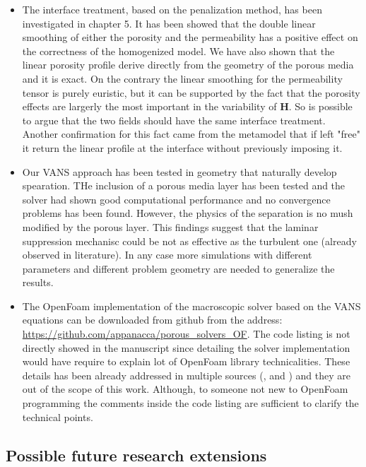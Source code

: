 \begin{itemize}
\item The interface treatment, based on the penalization method, has been investigated in chapter 5. It has been showed that the double linear
 smoothing of either the porosity and the permeability has a positive effect on the correctness of the homogenized model. We have also shown that the 
 linear porosity profile derive directly from the geometry of the porous media and it is exact. On the contrary the linear smoothing for the permeability tensor is 
 purely euristic, but it can be supported by the fact that the porosity effects are largerly the most important in the variability of $\mathbf{H}$. So is 
 possible to argue that the two fields should have the same interface treatment. Another confirmation for this fact came from the metamodel that if left "free" 
 it return the linear profile at the interface without previously imposing it.
 
 \item Our VANS approach has been tested in geometry that naturally develop spearation. THe inclusion of a porous media layer has been tested and the solver
 had shown good computational performance and no convergence problems has been found. However, the physics of the separation is no mush modified by the porous 
 layer. This findings suggest that the laminar suppression mechanisc could be not as effective as the turbulent one (already observed in literature). In any case more simulations
 with different parameters and different problem geometry are needed to generalize the results.

\item The OpenFoam implementation of the macroscopic solver based on the VANS equations can be downloaded from github from the address: \url{https://github.com/appanacca/porous_solvers_OF}.
The code listing is not directly showed in the manuscript since detailing the solver implementation would have require to explain lot of OpenFoam library 
technicalities. These details has been already addressed in multiple sources (\citet{jasak1996error}, \citet{moukalled2016finite} and 
\cite{maric2014openfoam}) and they are out of the scope of this work.
Although, to someone not new to OpenFoam programming the comments inside the code listing are sufficient to clarify the technical points.


\end{itemize}


\subsection{Possible future research extensions}

